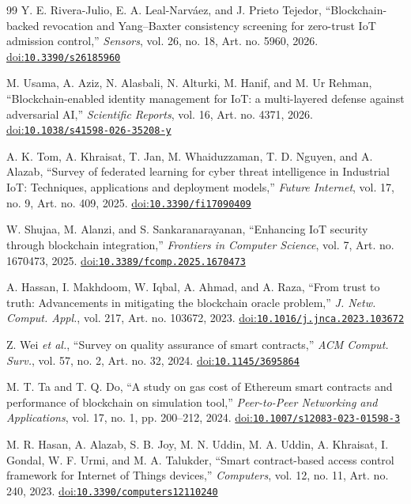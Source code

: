 \begin{thebibliography}{99}
Y. E. Rivera-Julio, E. A. Leal-Narv\'aez, and J. Prieto Tejedor, ``Blockchain-backed revocation and Yang--Baxter consistency screening for zero-trust IoT admission control,'' \emph{Sensors}, vol. 26, no. 18, Art. no. 5960, 2026. \href{https://doi.org/10.3390/s26185960}{doi:\nolinkurl{10.3390/s26185960}}

M. Usama, A. Aziz, N. Alasbali, N. Alturki, M. Hanif, and M. Ur Rehman, ``Blockchain-enabled identity management for IoT: a multi-layered defense against adversarial AI,'' \emph{Scientific Reports}, vol. 16, Art. no. 4371, 2026. \href{https://doi.org/10.1038/s41598-026-35208-y}{doi:\nolinkurl{10.1038/s41598-026-35208-y}}

A. K. Tom, A. Khraisat, T. Jan, M. Whaiduzzaman, T. D. Nguyen, and A. Alazab, ``Survey of federated learning for cyber threat intelligence in Industrial IoT: Techniques, applications and deployment models,'' \emph{Future Internet}, vol. 17, no. 9, Art. no. 409, 2025. \href{https://doi.org/10.3390/fi17090409}{doi:\nolinkurl{10.3390/fi17090409}}

W. Shujaa, M. Alanzi, and S. Sankaranarayanan, ``Enhancing IoT security through blockchain integration,'' \emph{Frontiers in Computer Science}, vol. 7, Art. no. 1670473, 2025. \href{https://doi.org/10.3389/fcomp.2025.1670473}{doi:\nolinkurl{10.3389/fcomp.2025.1670473}}

A. Hassan, I. Makhdoom, W. Iqbal, A. Ahmad, and A. Raza, ``From trust to truth: Advancements in mitigating the blockchain oracle problem,'' \emph{J. Netw. Comput. Appl.}, vol. 217, Art. no. 103672, 2023. \href{https://doi.org/10.1016/j.jnca.2023.103672}{doi:\nolinkurl{10.1016/j.jnca.2023.103672}}

Z. Wei \emph{et al.}, ``Survey on quality assurance of smart contracts,'' \emph{ACM Comput. Surv.}, vol. 57, no. 2, Art. no. 32, 2024. \href{https://doi.org/10.1145/3695864}{doi:\nolinkurl{10.1145/3695864}}

M. T. Ta and T. Q. Do, ``A study on gas cost of Ethereum smart contracts and performance of blockchain on simulation tool,'' \emph{Peer-to-Peer Networking and Applications}, vol. 17, no. 1, pp. 200--212, 2024. \href{https://doi.org/10.1007/s12083-023-01598-3}{doi:\nolinkurl{10.1007/s12083-023-01598-3}}

M. R. Hasan, A. Alazab, S. B. Joy, M. N. Uddin, M. A. Uddin, A. Khraisat, I. Gondal, W. F. Urmi, and M. A. Talukder, ``Smart contract-based access control framework for Internet of Things devices,'' \emph{Computers}, vol. 12, no. 11, Art. no. 240, 2023. \href{https://doi.org/10.3390/computers12110240}{doi:\nolinkurl{10.3390/computers12110240}}


\end{thebibliography}
